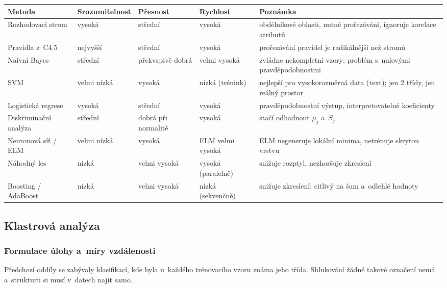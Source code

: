 \documentclass[11pt,a4paper]{article}
\theoremstyle{definition}
\begin{document}
\begin{center}
\small
\begin{tabular}{@{}p{2.9cm}p{2.3cm}p{2.2cm}p{2.3cm}p{4.6cm}@{}}
\toprule
\textbf{Metoda} & \textbf{Srozumitel\-nost} & \textbf{Přesnost} & \textbf{Rychlost}
  & \textbf{Poznámka} \\
\midrule
Rozhodovací strom & vysoká & střední & vysoká & obdélníkové oblasti, nutné prořezávání,
  ignoruje korelace atributů \\
Pravidla z~C4.5 & nejvyšší & střední & vysoká & prořezávání pravidel je radikálnější než
  stromů \\
Naivní Bayes & střední & překvapivě dobrá & velmi vysoká & zvládne nekompletní vzory;
  problém s~nulovými pravděpodobnostmi \\
SVM & velmi nízká & vysoká & nízká (trénink) & nejlepší pro vysokorozměrná data (text);
  jen 2 třídy, jen reálný prostor \\
Logistická regrese & vysoká & střední & vysoká & pravděpodobnostní výstup,
  interpretovatelné koeficienty \\
Diskriminační analýza & střední & dobrá při normalitě & vysoká & stačí odhadnout
  $\mu_j$ a~$S_j$ \\
Neuronová síť / ELM & velmi nízká & vysoká & ELM velmi vysoká & ELM negeneruje lokální
  minima, netrénuje skrytou vrstvu \\
Náhodný les & nízká & velmi vysoká & vysoká (paralelně) & snižuje rozptyl, nezhoršuje
  zkreslení \\
Boosting / AdaBoost & nízká & velmi vysoká & nízká (sekvenčně) & snižuje zkreslení; citlivý
  na šum a~odlehlé hodnoty \\
\bottomrule
\end{tabular}
\end{center}

\subsection{Klastrová analýza}
\label{ssec:clustering}

\subsubsection{Formulace úlohy a~míry vzdálenosti}

Předchozí oddíly se zabývaly klasifikací, kde byla u~každého trénovacího vzoru známa jeho
třída. Shlukování žádné takové označení nemá a~strukturu si musí v~datech najít samo.
\end{document}
